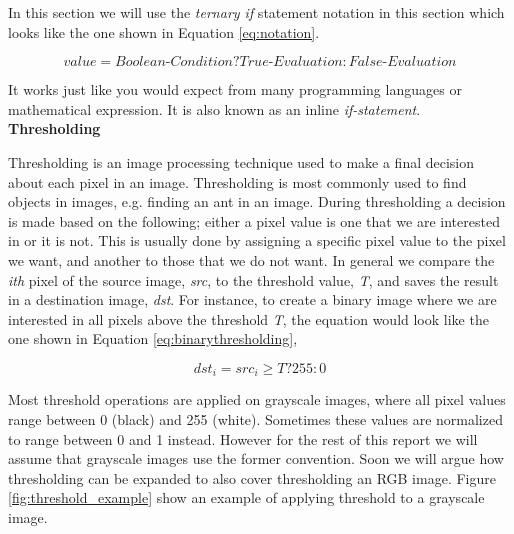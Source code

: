In this section we will use the \textit{ternary if} statement notation in this section which looks like the one shown in Equation \ref{eq:notation}.

\begin{equation}
value = {Boolean\mbox{-}Condition} ? {True\mbox{-}Evaluation}: {False\mbox{-}Evaluation}
\label{eq:notation}
\end{equation}

It works just like you would expect from many programming languages or mathematical expression. It is also known as an inline \textit{if-statement}. \\

\noindent \textbf{Thresholding} \par
Thresholding is an image processing technique used to make a final decision about each pixel in an image. Thresholding is most commonly used to find objects in images, e.g. finding an ant in an image. During thresholding a decision is made based on the following; either a pixel value is one that we are interested in or it is not. This is usually done by assigning a specific pixel value to the pixel we want, and another to those that we do not want. In general we compare the \textit{ith} pixel of the source image, \textit{src}, to the threshold value, \textit{T}, and saves the result in a destination image, \textit{dst}. For instance, to create a binary image where we are interested in all pixels above the threshold \textit{T}, the equation would look like the one shown in Equation \ref{eq:binarythresholding},

\begin{equation}
dst_i = src_i \geq T ? 255: 0
\label{eq:binarythresholding}
\end{equation}

Most threshold operations are applied on grayscale images, where all pixel values range between 0 (black) and 255 (white). Sometimes these values are normalized to range between 0 and 1 instead. However for the rest of this report we will assume that grayscale images use the former convention. Soon we will argue how thresholding can be expanded to also cover thresholding an RGB image. Figure \ref{fig:threshold_example} show an example of applying threshold to a grayscale image.

